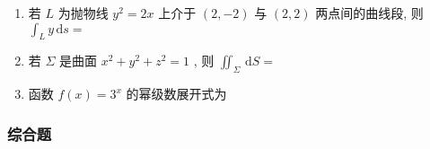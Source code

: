 \documentclass[cn,11pt,fancy,hide]{elegantbook}
\newcommand{\dd}{\,\mathrm{d}}
\begin{document}
\begin{enumerate}
	\item 若 $L$ 为抛物线 $y^2=2x$ 上介于 $(2,-2)$ 与 $(2,2)$ 两点间的曲线段, 则 $\int_{L} y\dd s=$\underline{\hspace{8pc}}
	
	\item 若 $\Sigma$ 是曲面 $x^2+y^2+z^2=1$ , 则 $\iint_{\Sigma} \dd S=$\underline{\hspace{8pc}}
	
	\item 函数 $f(x)=3^x$ 的幂级数展开式为\underline{\hspace{8pc}}
\end{enumerate}

\subsubsection{综合题}
\end{document}
